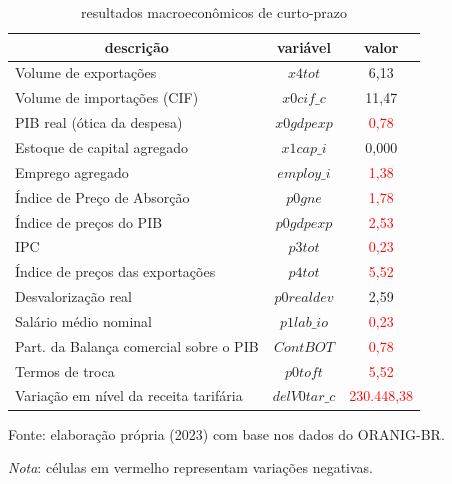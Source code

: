 \begin{table}[h]
	\centering
	\begin{threeparttable}
		\caption{resultados macroeconômicos de curto-prazo} \label{tab:macro}
		\begin{tabular}{lcc}
			\toprule
			\multicolumn{1}{c}{\textbf{descrição}} & \textbf{variável} & \textbf{valor} \\ \hline
			Volume de exportações                   & $x4tot$          & 6,13 \\
			Volume de importações (CIF)             & $x0cif\_c$       & 11,47 \\
			PIB real (ótica da despesa)             & $x0gdpexp$       & \textcolor{red}{0,78} \\
			Estoque de capital agregado             & $x1cap\_i$       & 0,000 \\
			Emprego agregado                        & $employ\_i$      & \textcolor{red}{1,38} \\
			Índice de Preço de Absorção             & $p0gne$          & \textcolor{red}{1,78} \\
			Índice de preços do PIB                 & $p0gdpexp$       & \textcolor{red}{2,53} \\
			IPC                                     & $p3tot$          & \textcolor{red}{0,23} \\
			Índice de preços das exportações        & $p4tot$          & \textcolor{red}{5,52} \\
			Desvalorização real                     & $p0realdev$      & 2,59 \\
			Salário médio nominal                   & $p1lab\_io$      & \textcolor{red}{0,23} \\
			Part. da Balança comercial sobre o PIB  & $ContBOT$        & \textcolor{red}{0,78} \\
			Termos de troca                         & $p0toft$         & \textcolor{red}{5,52} \\
			Variação em nível da receita tarifária  & $delV0tar\_c$    & \textcolor{red}{230.448,38} \\
			\bottomrule
		\end{tabular}
		\begin{tablenotes}
			\small
			\item Fonte: elaboração própria (2023) com base nos dados do ORANIG-BR.
			\item \textit{Nota}: células em vermelho representam variações negativas.
		\end{tablenotes}
		\end{threeparttable}
	\end{table}

